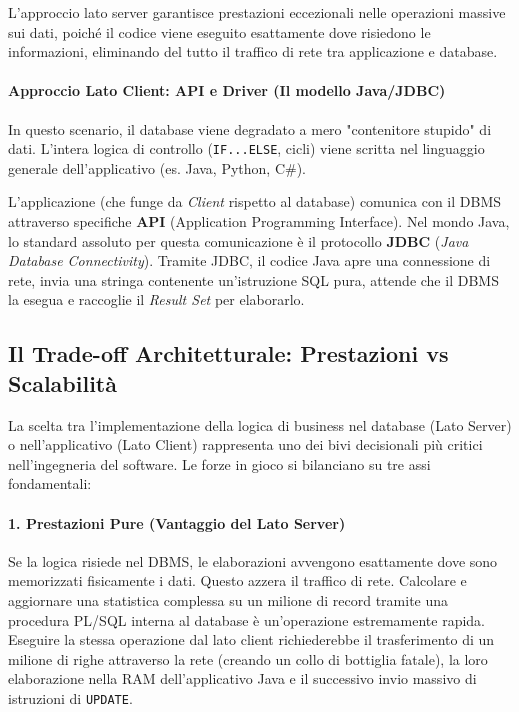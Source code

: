 L'approccio lato server garantisce prestazioni eccezionali nelle operazioni massive sui dati, poiché il codice viene eseguito esattamente dove risiedono le informazioni, eliminando del tutto il traffico di rete tra applicazione e database.

\paragraph{Approccio Lato Client: API e Driver (Il modello Java/JDBC)}

In questo scenario, il database viene degradato a mero "contenitore stupido" di dati. L'intera logica di controllo (\texttt{IF...ELSE}, cicli) viene scritta nel linguaggio generale dell'applicativo (es. Java, Python, C\#).

L'applicazione (che funge da \textit{Client} rispetto al database) comunica con il DBMS attraverso specifiche \textbf{API} (Application Programming Interface). Nel mondo Java, lo standard assoluto per questa comunicazione è il protocollo \textbf{JDBC} (\textit{Java Database Connectivity}). Tramite JDBC, il codice Java apre una connessione di rete, invia una stringa contenente un'istruzione SQL pura, attende che il DBMS la esegua e raccoglie il \textit{Result Set} per elaborarlo.

\subsection{Il Trade-off Architetturale: Prestazioni vs Scalabilità}

La scelta tra l'implementazione della logica di business nel database (Lato Server) o nell'applicativo (Lato Client) rappresenta uno dei bivi decisionali più critici nell'ingegneria del software. Le forze in gioco si bilanciano su tre assi fondamentali:

\paragraph{1. Prestazioni Pure (Vantaggio del Lato Server)}
Se la logica risiede nel DBMS, le elaborazioni avvengono esattamente dove sono memorizzati fisicamente i dati. Questo azzera il traffico di rete. Calcolare e aggiornare una statistica complessa su un milione di record tramite una procedura PL/SQL interna al database è un'operazione estremamente rapida. Eseguire la stessa operazione dal lato client richiederebbe il trasferimento di un milione di righe attraverso la rete (creando un collo di bottiglia fatale), la loro elaborazione nella RAM dell'applicativo Java e il successivo invio massivo di istruzioni di \texttt{UPDATE}.

